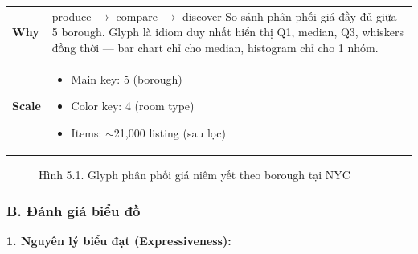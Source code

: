 \begin{longtable}{@{} p{2.8cm} p{12cm} @{}}
\textbf{Why} & produce $\rightarrow$ compare $\rightarrow$ discover \newline
So sánh phân phối giá đầy đủ giữa 5 borough. Glyph là idiom duy nhất hiển thị Q1, median, Q3, whiskers đồng thời --- bar chart chỉ cho median, histogram chỉ cho 1 nhóm. \\
\addlinespace[0.2cm]

\textbf{Scale} &
\begin{itemize}[nosep, leftmargin=*, topsep=0pt]
    \item Main key: 5 (borough)
    \item Color key: 4 (room type)
    \item Items: $\sim$21,000 listing (sau lọc)
\end{itemize} \\
\end{longtable}

\begin{figure}[H]
    \centering
    \caption{Hình 5.1. Glyph phân phối giá niêm yết theo borough tại NYC}
    \label{fig:domain-task5-chart1}
\end{figure}

\subsubsection*{B. Đánh giá biểu đồ}

\textbf{1. Nguyên lý biểu đạt (Expressiveness):}

